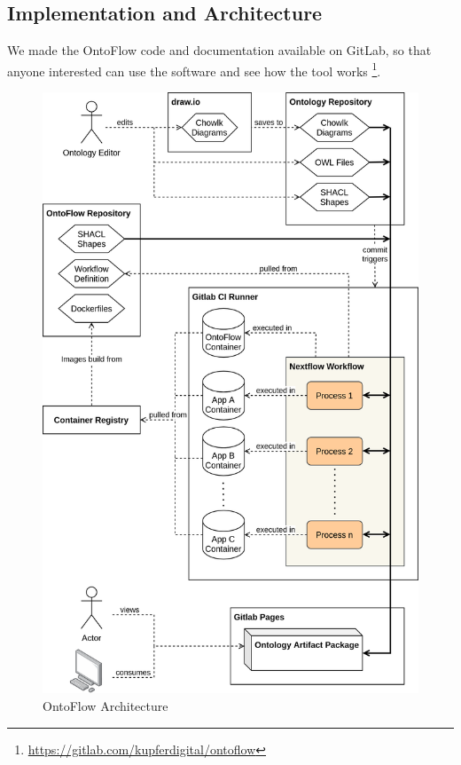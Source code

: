 \documentclass[sigconf]{acmart}
\begin{document}
\subsection{Implementation and Architecture}
We made the OntoFlow code and documentation available on GitLab, so that anyone interested can use the software and see how the tool works \footnote{\url{https://gitlab.com/kupferdigital/ontoflow}}. 
\begin{figure}[h]
  \centering
  \includegraphics[width=\columnwidth]{architecture.png}
  \caption{OntoFlow Architecture}
  \label{fig:architecture}
\end{figure}
\end{document}
